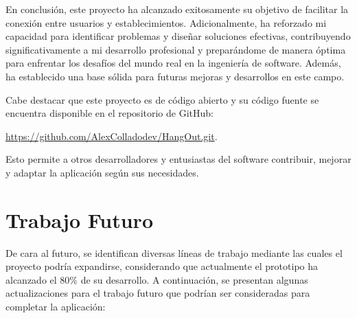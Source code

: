 En conclusión, este proyecto ha alcanzado exitosamente su objetivo de facilitar la conexión entre usuarios y establecimientos. Adicionalmente, ha reforzado mi capacidad para identificar problemas y diseñar soluciones efectivas, contribuyendo significativamente a mi desarrollo profesional y preparándome de manera óptima para enfrentar los desafíos del mundo real en la ingeniería de software. Además, ha establecido una base sólida para futuras mejoras y desarrollos en este campo.

Cabe destacar que este proyecto es de código abierto y su código fuente se encuentra disponible en el repositorio de GitHub:

\url{https://github.com/AlexColladodev/HangOut.git}.

\noindent Esto permite a otros desarrolladores y entusiastas del software contribuir, mejorar y adaptar la aplicación según sus necesidades.


\section{Trabajo Futuro}

De cara al futuro, se identifican diversas líneas de trabajo mediante las cuales el proyecto podría expandirse, considerando que actualmente el prototipo ha alcanzado el 80\% de su desarrollo. A continuación, se presentan algunas actualizaciones para el trabajo futuro que podrían ser consideradas para completar la aplicación:

